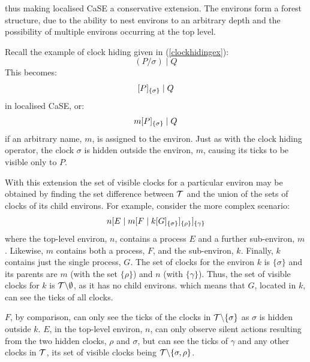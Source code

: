 \noindent thus making localised CaSE a conservative extension.  The
environs form a forest structure, due to the ability to nest
environs to an arbitrary depth and the possibility of multiple
environs occurring at the top level.

Recall the example of clock hiding given in (\ref{clockhidingex}):
\begin{equation}
  (P / \sigma)\;|\;Q
\end{equation}
This becomes:
\begin{equation}
  {}[ P ]_{\{\sigma\}}\;|\;Q
\end{equation}
in localised CaSE, or:
\begin{equation}
  {m}[ P ]_{\{\sigma\}}\;|\;Q
\end{equation}
if an arbitrary name, $m$, is assigned to the environ.  Just
as with the clock hiding operator, the clock $\sigma$ is hidden outside
the environ, $m$, causing its ticks to be visible only to $P$.  

With this extension the set of visible clocks for a particular environ
may be obtained by finding the set difference between $\text{$\mathcal{T}$}$ and
the union of the sets of clocks of its child environs.  For example,
consider the more complex scenario:
\begin{equation}
{n}[ E\;|\;{m}[ F\;|\;{k}[ G ]_{\{\sigma\}} ]_{\{\rho\}} ]_{\{\gamma\}}
\end{equation}
where the top-level environ, $n$, contains a process $E$ and a further
sub-environ, $m$.  Likewise, $m$ contains both a process, $F$, and the
sub-environ, $k$.  Finally, $k$ contains just the single process, $G$.
The set of clocks for the environ $k$ is $\{\sigma\}$ and its parents
are $m$ (with the set $\{\rho\}$) and $n$ (with $\{\gamma\}$).  Thus,
the set of visible clocks for $k$ is $\text{$\mathcal{T}$} \backslash \emptyset$,
as it has no child environs.  which means that $G$, located in $k$,
can see the ticks of all clocks.

$F$, by comparison, can only see the ticks of the clocks in $\text{$\mathcal{T}$}
\backslash \{\sigma\}$ as $\sigma$ is hidden outside $k$.  $E$, in the
top-level environ, $n$, can only observe silent actions resulting from
the two hidden clocks, $\rho$ and $\sigma$, but can see the ticks of
$\gamma$ and any other clocks in $\text{$\mathcal{T}$}$, its set of visible clocks
being $\text{$\mathcal{T}$} \backslash \{\sigma, \rho\}$.

